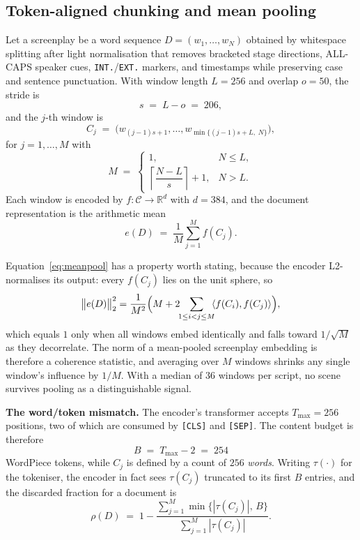 \documentclass[conference,a4paper]{IEEEtran}
\newcommand{\hlt}[1]{\textbf{#1}}
\begin{document}
\subsection{Token-aligned chunking and mean pooling}
\label{sec:tokens}

Let a screenplay be a word sequence $D = (w_1, \dots, w_N)$ obtained by
whitespace splitting after light normalisation that removes bracketed
stage directions, ALL-CAPS speaker cues, \texttt{INT.}/\texttt{EXT.}
markers, and timestamps while preserving case and sentence punctuation.
With window length $L = 256$ and overlap $o = 50$, the stride is
\begin{equation}
s \;=\; L - o \;=\; 206 ,
\end{equation}
and the $j$-th window is
\begin{equation}
C_j \;=\; \bigl(w_{(j-1)s+1}, \dots, w_{\min\{(j-1)s+L,\; N\}}\bigr),
\end{equation}
for $j = 1, \dots, M$ with
\begin{equation}
M \;=\;
\begin{cases}
1, & N \le L,\\[2pt]
\left\lceil \dfrac{N - L}{s} \right\rceil + 1, & N > L .
\end{cases}
\end{equation}
Each window is encoded by $f: \mathcal{C} \to \mathbb{R}^{d}$ with
$d = 384$, and the document representation is the arithmetic mean
\begin{equation}
\label{eq:meanpool}
e(D) \;=\; \frac{1}{M} \sum_{j=1}^{M} f(C_j) .
\end{equation}

Equation~\eqref{eq:meanpool} has a property worth stating, because the
encoder L2-normalises its output: every $f(C_j)$ lies on the unit sphere,
so
\begin{equation}
\label{eq:norm}
\bigl\| e(D) \bigr\|_2^2
= \frac{1}{M^2}\Bigl( M + 2\!\!\sum_{1 \le i < j \le M}\!\!
  \langle f(C_i), f(C_j)\rangle \Bigr),
\end{equation}
which equals $1$ only when all windows embed identically and falls toward
$1/\sqrt{M}$ as they decorrelate. The norm of a mean-pooled screenplay
embedding is therefore a coherence statistic, and averaging over $M$
windows shrinks any single window's influence by $1/M$. With a median of
$36$ windows per script, no scene survives pooling as a distinguishable
signal.

\hlt{The word/token mismatch.} The encoder's transformer accepts
$T_{\max} = 256$ positions, two of which are consumed by \texttt{[CLS]}
and \texttt{[SEP]}. The content budget is therefore
\begin{equation}
B \;=\; T_{\max} - 2 \;=\; 254
\end{equation}
WordPiece tokens, while $C_j$ is defined by a count of $256$
\emph{words}. Writing $\tau(\cdot)$ for the tokeniser, the encoder in
fact sees $\tau(C_j)$ truncated to its first $B$ entries, and the
discarded fraction for a document is
\begin{equation}
\rho(D) \;=\; 1 - \frac{\sum_{j=1}^{M} \min\bigl\{|\tau(C_j)|,\, B\bigr\}}
                        {\sum_{j=1}^{M} |\tau(C_j)|} .
\end{equation}
\end{document}
